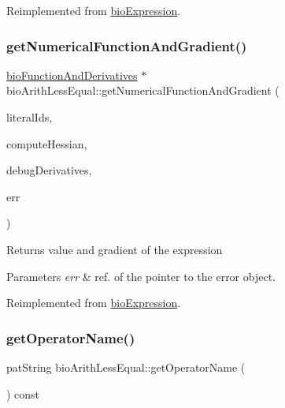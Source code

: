 Reimplemented from \hyperlink{classbio_expression_a3e4b4dca58dbbc6f0e411b30eb3f60b4}{bio\+Expression}.

\mbox{\label{classbio_arith_less_equal_a718044c38d59fc7639656a7754bfb090}} 
\subsubsection{\texorpdfstring{get\+Numerical\+Function\+And\+Gradient()}{getNumericalFunctionAndGradient()}}
{\footnotesize\ttfamily \hyperlink{classbio_function_and_derivatives}{bio\+Function\+And\+Derivatives} $\ast$ bio\+Arith\+Less\+Equal\+::get\+Numerical\+Function\+And\+Gradient (\begin{DoxyParamCaption}\item[{vector$<$ pat\+U\+Long $>$}]{literal\+Ids,  }\item[{pat\+Boolean}]{compute\+Hessian,  }\item[{pat\+Boolean}]{debug\+Derivatives,  }\item[{pat\+Error $\ast$\&}]{err }\end{DoxyParamCaption})\hspace{0.3cm}{\ttfamily [virtual]}}

\begin{DoxyReturn}{Returns}
value and gradient of the expression 
\end{DoxyReturn}

\begin{DoxyParams}{Parameters}
{\em err} & ref. of the pointer to the error object. \\
\hline
\end{DoxyParams}


Reimplemented from \hyperlink{classbio_expression_a91c81ce80c9e972c913b10f5f3c1ed13}{bio\+Expression}.

\mbox{\label{classbio_arith_less_equal_ad33162b75241a2efee3ace47e899de11}} 
\subsubsection{\texorpdfstring{get\+Operator\+Name()}{getOperatorName()}}
{\footnotesize\ttfamily pat\+String bio\+Arith\+Less\+Equal\+::get\+Operator\+Name (\begin{DoxyParamCaption}{ }\end{DoxyParamCaption}) const\hspace{0.3cm}{\ttfamily [virtual]}}


